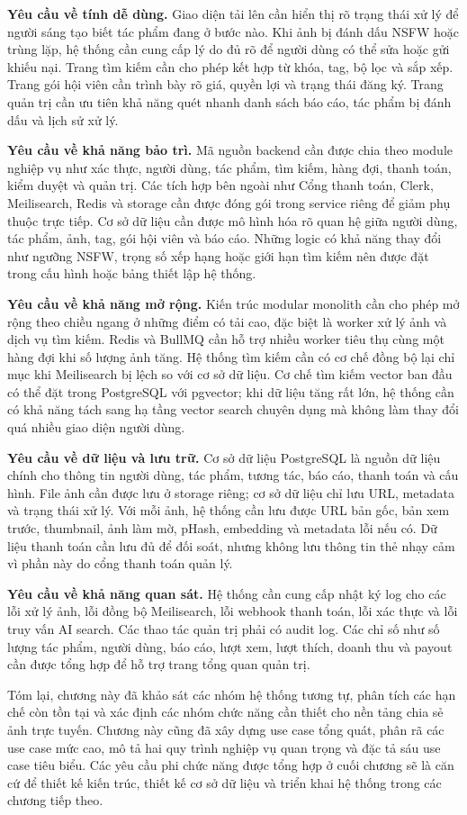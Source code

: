\textbf{Yêu cầu về tính dễ dùng.} Giao diện tải lên cần hiển thị rõ trạng thái xử lý để người sáng tạo biết tác phẩm đang ở bước nào. Khi ảnh bị đánh dấu NSFW hoặc trùng lặp, hệ thống cần cung cấp lý do đủ rõ để người dùng có thể sửa hoặc gửi khiếu nại. Trang tìm kiếm cần cho phép kết hợp từ khóa, tag, bộ lọc và sắp xếp. Trang gói hội viên cần trình bày rõ giá, quyền lợi và trạng thái đăng ký. Trang quản trị cần ưu tiên khả năng quét nhanh danh sách báo cáo, tác phẩm bị đánh dấu và lịch sử xử lý.

\textbf{Yêu cầu về khả năng bảo trì.} Mã nguồn backend cần được chia theo module nghiệp vụ như xác thực, người dùng, tác phẩm, tìm kiếm, hàng đợi, thanh toán, kiểm duyệt và quản trị. Các tích hợp bên ngoài như Cổng thanh toán, Clerk, Meilisearch, Redis và storage cần được đóng gói trong service riêng để giảm phụ thuộc trực tiếp. Cơ sở dữ liệu cần được mô hình hóa rõ quan hệ giữa người dùng, tác phẩm, ảnh, tag, gói hội viên và báo cáo. Những logic có khả năng thay đổi như ngưỡng NSFW, trọng số xếp hạng hoặc giới hạn tìm kiếm nên được đặt trong cấu hình hoặc bảng thiết lập hệ thống.

\textbf{Yêu cầu về khả năng mở rộng.} Kiến trúc modular monolith cần cho phép mở rộng theo chiều ngang ở những điểm có tải cao, đặc biệt là worker xử lý ảnh và dịch vụ tìm kiếm. Redis và BullMQ cần hỗ trợ nhiều worker tiêu thụ cùng một hàng đợi khi số lượng ảnh tăng. Hệ thống tìm kiếm cần có cơ chế đồng bộ lại chỉ mục khi Meilisearch bị lệch so với cơ sở dữ liệu. Cơ chế tìm kiếm vector ban đầu có thể đặt trong PostgreSQL với pgvector; khi dữ liệu tăng rất lớn, hệ thống cần có khả năng tách sang hạ tầng vector search chuyên dụng mà không làm thay đổi quá nhiều giao diện người dùng.

\textbf{Yêu cầu về dữ liệu và lưu trữ.} Cơ sở dữ liệu PostgreSQL là nguồn dữ liệu chính cho thông tin người dùng, tác phẩm, tương tác, báo cáo, thanh toán và cấu hình. File ảnh cần được lưu ở storage riêng; cơ sở dữ liệu chỉ lưu URL, metadata và trạng thái xử lý. Với mỗi ảnh, hệ thống cần lưu được URL bản gốc, bản xem trước, thumbnail, ảnh làm mờ, pHash, embedding và metadata lỗi nếu có. Dữ liệu thanh toán cần lưu đủ để đối soát, nhưng không lưu thông tin thẻ nhạy cảm vì phần này do cổng thanh toán quản lý.

\textbf{Yêu cầu về khả năng quan sát.} Hệ thống cần cung cấp nhật ký log cho các lỗi xử lý ảnh, lỗi đồng bộ Meilisearch, lỗi webhook thanh toán, lỗi xác thực và lỗi truy vấn AI search. Các thao tác quản trị phải có audit log. Các chỉ số như số lượng tác phẩm, người dùng, báo cáo, lượt xem, lượt thích, doanh thu và payout cần được tổng hợp để hỗ trợ trang tổng quan quản trị.

Tóm lại, chương này đã khảo sát các nhóm hệ thống tương tự, phân tích các hạn chế còn tồn tại và xác định các nhóm chức năng cần thiết cho nền tảng chia sẻ ảnh trực tuyến. Chương này cũng đã xây dựng use case tổng quát, phân rã các use case mức cao, mô tả hai quy trình nghiệp vụ quan trọng và đặc tả sáu use case tiêu biểu. Các yêu cầu phi chức năng được tổng hợp ở cuối chương sẽ là căn cứ để thiết kế kiến trúc, thiết kế cơ sở dữ liệu và triển khai hệ thống trong các chương tiếp theo.
